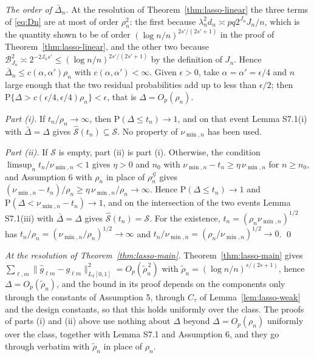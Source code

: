\documentclass[10pt]{book}
\theoremstyle{definition}
\newcommand{\Prob}{\mathrm{P}}
\newcommand{\cv}{\ell}
\newcommand{\md}{m}
\newcommand{\gcomp}[2]{g_{#1#2}}
\newcommand{\penn}{\lambda_{n}}
\newcommand{\seff}{s'}
\newcommand{\rhoG}{\rho^{\mathcal{G}}_{n}}
\begin{document}
{\emph{The order of $\bar{\Delta}_n$.} At the resolution of Theorem~\ref{thm:lasso-linear} the three terms of
\eqref{eq:Dn} are at most of order $\rho_n^2$: the first because
$\penn^2d_n \asymp pq2^{J_n}J_n/n$, which is the quantity shown to be of order
$(\log n/n)^{2\seff/(2\seff+1)}$ in the proof of Theorem~\ref{thm:lasso-linear}, and the other two
because $\mathcal{B}^2_{J_n} \asymp 2^{-2J_n\seff} \le
(\log n/n)^{2\seff/(2\seff+1)}$ by the definition of $J_n$. Hence
$\bar{\Delta}_n \le c(\alpha,\alpha')\rho_n$ with $c(\alpha,\alpha') < \infty$. Given $\epsilon > 0$,
take $\alpha = \alpha' = \epsilon/4$ and $n$ large enough that the two
residual probabilities add up to less than $\epsilon/2$; then
$\Prob\{\Delta > c(\epsilon/4,\epsilon/4)\rho_n\} < \epsilon$, that is
$\Delta = O_p(\rho_n)$.

\emph{Part (i).} If $t_n/\rho_n \to \infty$, then
$\Prob(\Delta \le t_n) \to 1$, and on that event Lemma S7.1(i) with
$\bar{\Delta} = \Delta$ gives $\widehat{\mathcal{S}}(t_n) \subseteq \mathcal{S}$. No property of $\nu_{\min,n}$
has been used.

\emph{Part (ii).} If $\mathcal{S}$ is empty, part (ii) is part (i). Otherwise, the
condition $\limsup_n t_n/\nu_{\min,n} < 1$ gives $\eta > 0$ and $n_0$ with
$\nu_{\min,n} - t_n \ge \eta\,\nu_{\min,n}$ for $n \ge n_0$, and Assumption 6 with $\rho_n$ in place of $\rhoG$ gives
$(\nu_{\min,n} - t_n)/\rho_n \ge \eta\,\nu_{\min,n}/\rho_n \to \infty$. Hence
$\Prob(\Delta \le t_n) \to 1$ and $\Prob(\Delta < \nu_{\min,n} - t_n) \to 1$, and
on the intersection of the two events Lemma S7.1(iii) with $\bar{\Delta} = \Delta$ gives
$\widehat{\mathcal{S}}(t_n) = \mathcal{S}$. For the existence, $t_n = (\rho_n\nu_{\min,n})^{1/2}$ has
$t_n/\rho_n = (\nu_{\min,n}/\rho_n)^{1/2} \to \infty$ and
$t_n/\nu_{\min,n} = (\rho_n/\nu_{\min,n})^{1/2} \to 0$. \qed

\textcolor{colR1}{\emph{At the resolution of Theorem~\ref{thm:lasso-main}.} Theorem~\ref{thm:lasso-main} gives
$\sum_{\cv,\md}\lVert\widehat{g}_{\cv\md}-\gcomp{\cv}{\md}\rVert^2_{L_2[0,1]}
= O_p(\tilde\rho_n^{\,2})$ with $\tilde\rho_n = (\log n/n)^{s/(2s+1)}$, hence
$\Delta = O_p(\tilde\rho_n)$, and the bound in its proof depends on the
components only through the constants of Assumption 5, through $C_\tau$ of
Lemma~\ref{lem:lasso-weak} and the design constants, so that this holds uniformly over the
class. The proofs of parts (i) and (ii) above use nothing about $\Delta$
beyond $\Delta = O_p(\rho_n)$ uniformly over the class, together with
Lemma S7.1 and Assumption 6, and they go through verbatim with
$\tilde\rho_n$ in place of $\rho_n$.}
}

\bibhang=1.7pc
\bibsep=2pt
\fontsize{9}{14pt plus.8pt minus .6pt}\selectfont
\renewcommand\bibname{\large \bf References}


\end{document}
